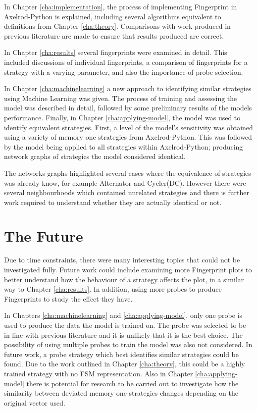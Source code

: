 In Chapter \ref{cha:implementation}, the process of implementing Fingerprint in Axelrod-Python is explained, including several algorithms equivalent to definitions from Chapter \ref{cha:theory}.
Comparisons with work produced in previous literature are made to ensure that results produced are correct.

In Chapter \ref{cha:results} several fingerprints were examined in detail.
This included discussions of individual fingerprints, a comparison of fingerprints for a strategy with a varying parameter, and also the importance of probe selection.

In Chapter \ref{cha:machinelearning} a new approach to identifying similar strategies using Machine Learning was given.
The process of training and assessing the model was described in detail, followed by some preliminary results of the models performance.
Finally, in Chapter \ref{cha:applying-model}, the model was used to identify equivalent strategies.
First, a level of the model's sensitivity was obtained using a variety of memory one strategies from Axelrod-Python.
This was followed by the model being applied to all strategies within Axelrod-Python; producing network graphs of strategies the model considered identical.

The networks graphs highlighted several cases where the equivalence of strategies was already know, for example Alternator and Cycler(DC).
However there were several neighbourhoods which contained unrelated strategies and there is further work required to understand whether they are actually identical or not.



\section{The Future}

Due to time constraints, there were many interesting topics that could not be investigated fully.
Future work could include examining more Fingerprint plots to better understand how the behaviour of a strategy affects the plot, in a similar way to Chapter \ref{cha:results}.
In addition, using more probes to produce Fingerprints to study the effect they have.

In Chapters \ref{cha:machinelearning} and \ref{cha:applying-model}, only one probe is used to produce the data the model is trained on.
The probe was selected to be in line with previous literature and it is unlikely that it is the best choice.
The possibility of using multiple probes to train the model was also not considered.
In future work, a probe strategy which best identifies similar strategies could be found.
Due to the work outlined in Chapter \ref{cha:theory}, this could be a highly trained strategy with no FSM representation.
Also in Chapter \ref{cha:applying-model} there is potential for research to be carried out to investigate how the similarity between deviated memory one strategies changes depending on the original vector used.

